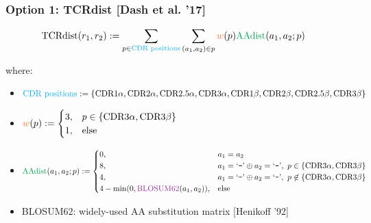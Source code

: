 \documentclass[mathserif,compress,xcolor={dvipsnames}]{beamer}
\renewcommand\;{\,}
\begin{document}
\begin{frame}\frametitle{Option 1: TCRdist [Dash et al. '17]}
\begin{align}
\text{TCRdist}(r_1, r_2)
	& := \sum_{p \in \text{{\color{ProcessBlue} CDR positions}}} 
		\sum_{(a_1, a_2) \in p}
		{\color{Orange} w}(p) 
		\text{{\color{Green} AAdist}}(a_1, a_2; p)
\end{align}

where:
\footnotesize
\begin{itemize}
\item
$\text{{\color{ProcessBlue} CDR positions}} 
	:= \{\text{CDR1}\alpha, \text{CDR2}\alpha, \text{CDR2.5}\alpha, 
		\text{CDR3}\alpha,
		 \text{CDR1}\beta, \text{CDR2}\beta, \text{CDR2.5}\beta, \text{CDR3}\beta\}$
\item 
$ {\color{Orange} w}(p) := \begin{cases} 3, & p \in \{\text{CDR3}\alpha, \text{CDR3}\beta\} \\
						1, & \text{else}
		\end{cases}$
\item
$ \text{{\color{Green} AAdist}}(a_1, a_2; p) := 
\begin{cases}
	0, & a_1 = a_2 \\
	8, & a_1 = \text{`}\texttt{-}\text{'} \oplus a_2 = \text{`}\texttt{-}\text{'}, 
		\ p \in \{\text{CDR3}\alpha, \text{CDR3}\beta\} \\
	4, & a_1 = \text{`}\texttt{-}\text{'} \oplus a_2 = \text{`}\texttt{-}\text{'}, 
		\ p \not\in \{\text{CDR3}\alpha, \text{CDR3}\beta\} \\

	4 - \min(0,  \text{{\color{Purple} BLOSUM62}}(a_1, a_2)), & \text{else} 
\end{cases}$ 
\item
{\color{Purple} BLOSUM62}: widely-used AA substitution matrix
[Henikoff '92]
\end{itemize}
\end{frame}
\end{document}
